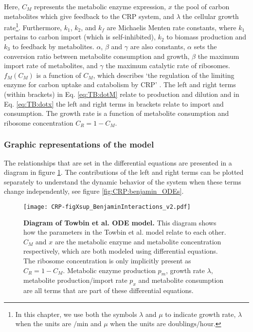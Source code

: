 Here, $C_M$ represents the metabolic enzyme expression, $x$ the pool of carbon metabolites which give feedback to the CRP system, and $\lambda$ the cellular growth rate\footnote{
    In this chapter, we use both the symbols $\lambda$ and $\mu$ to indicate growth rate,
    $\lambda$ when the units are $/\text{min}$ and
    $\mu$ when the units are $\text{doublings}/\text{hour}$.}.
%
Furthermore, $k_1$, $k_2$, and $k_f$ are Michaelis Menten rate constants, where $k_1$ pertains to carbon import (which is self-inhibited), $k_2$ to biomass production and $k_3$ to feedback by metabolites.
%
$\alpha$, $\beta$ and $\gamma$ are also constants, 
$\alpha$ sets the conversion ratio between metabolite consumption and growth,
$\beta$ the maximum import rate of metabolites,
and $\gamma$ the maximum catalytic rate of ribosomes.
%
$f_M(C_M)$ is a function of $C_M$, which describes \lq{the regulation of the limiting enzyme for carbon uptake and catabolism by CRP}\rq{} \cite{Towbin2017}. 
%
The left and right terms (within brackets) in Eq. \ref{eq:TB:dotM} relate to production and dilution and in Eq. \ref{eq:TB:dotx} the left and right terms in brackets relate to import and consumption.
%
The growth rate is a function of metabolite consumption and ribosome concentration $C_R=1-C_M$.

\subsubsection*{Graphic representations of the model}

The relationships that are set in the differential equations are presented in a diagram in figure \ref{fig:CRP:benjamin_ODEs_diagram}.
%
The contributions of the left and right terms can be plotted separately to understand the dynamic behavior of the system when these terms change independently, see figure \ref{fig:CRP:benjamin_ODEs}.

\begin{figure}
	\centering
	\texttt{[image: CRP-figXsup\_BenjaminInteractions\_v2.pdf]}
	\caption{ 
		\textbf{Diagram of Towbin et al. ODE model.}
		This diagram shows how the parameters in the Towbin et al. model relate to each other. $C_M$ and $x$ are the metabolic enzyme and metabolite concentration respectively, which are both modeled using differential equations. The ribosome concentration is only implicitly present as $C_R=1-C_M$. Metabolic enzyme production $p_m$, growth rate $\lambda$, metabolite production/import rate $p_x$ and metabolite consumption are all terms that are part of these differential equations.
	}
	\label{fig:CRP:benjamin_ODEs_diagram}
\end{figure}


